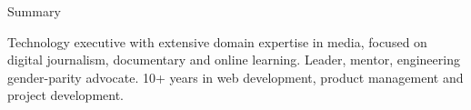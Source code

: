 \documentclass{resume} %
\begin{document}

\begin{rSection}{Summary}

Technology executive with extensive domain expertise in media, focused on digital journalism, documentary and online learning. Leader, mentor, engineering gender-parity advocate. 10+ years in web development, product management and project development.

\end{rSection}


\end{document}
